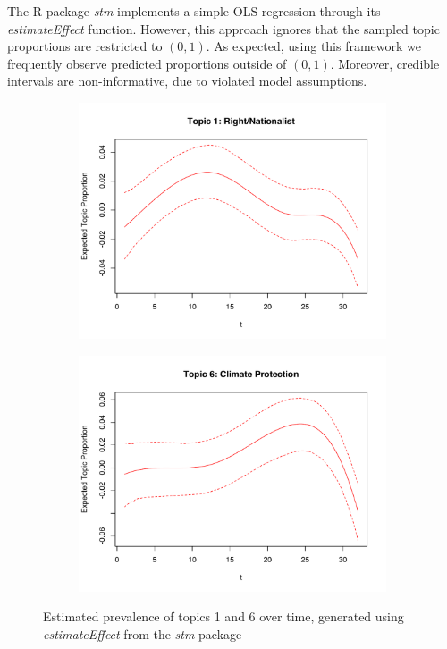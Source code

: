 \noindent The R package \textit{stm} implements a simple OLS regression through its \textit{estimateEffect} function. However, this approach ignores that the sampled topic proportions are restricted to $(0,1)$. As expected, using this framework we frequently observe predicted proportions outside of $(0,1)$. Moreover, credible intervals are non-informative, due to violated model assumptions. 

\begin{figure}[h!]
  \centering
  \captionsetup{justification=centering,margin=2cm}
  \begin{subfigure}[b]{0.4\linewidth}
    \includegraphics[width=\linewidth]{../plots/4_4/estEffect_topic1.pdf}
  \end{subfigure}
  \begin{subfigure}[b]{0.4\linewidth}
    \includegraphics[width=\linewidth]{../plots/4_4/estEffect_topic6.pdf}
  \end{subfigure}
  \caption{Estimated prevalence of topics 1 and 6 over time, generated using \textit{estimateEffect} from the \textit{stm} package}
  \label{fig:coffee}
\end{figure}

